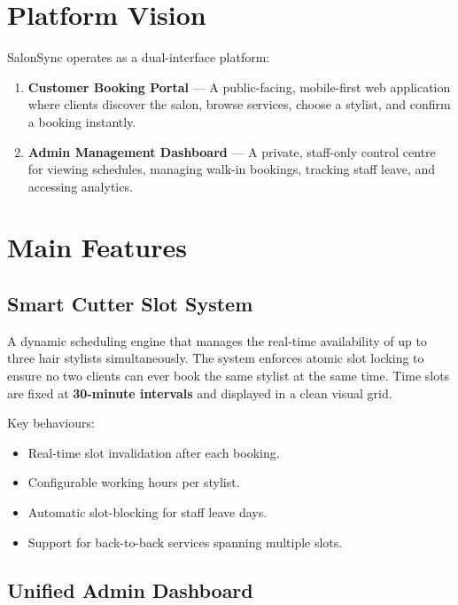 \documentclass[12pt,a4paper]{report}
\begin{document}
\section{Platform Vision}

SalonSync operates as a dual-interface platform:

\begin{enumerate}[leftmargin=2em]
  \item \textbf{Customer Booking Portal} — A public-facing, mobile-first web application
        where clients discover the salon, browse services, choose a stylist, and confirm
        a booking instantly.
  \item \textbf{Admin Management Dashboard} — A private, staff-only control centre
        for viewing schedules, managing walk-in bookings, tracking staff leave, and
        accessing analytics.
\end{enumerate}

\section{Main Features}

\subsection{Smart Cutter Slot System}

A dynamic scheduling engine that manages the real-time availability of up to three
hair stylists simultaneously. The system enforces atomic slot locking to ensure no
two clients can ever book the same stylist at the same time. Time slots are fixed at
\textbf{30-minute intervals} and displayed in a clean visual grid.

Key behaviours:
\begin{itemize}[leftmargin=2em]
  \item Real-time slot invalidation after each booking.
  \item Configurable working hours per stylist.
  \item Automatic slot-blocking for staff leave days.
  \item Support for back-to-back services spanning multiple slots.
\end{itemize}

\subsection{Unified Admin Dashboard}
\end{document}
